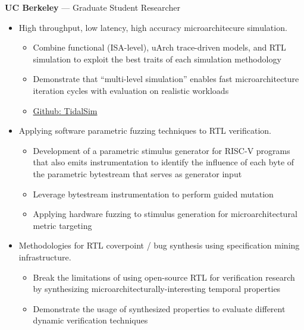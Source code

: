 \documentclass[10pt]{article}
\begin{document}
 \textbf{UC Berkeley} --- Graduate Student Researcher
\begin{itemize}
    \item High throughput, low latency, high accuracy microarchitecure simulation.
    \begin{itemize}
        \item Combine functional (ISA-level), uArch trace-driven models, and RTL simulation to exploit the best traits of each simulation methodology
        \item Demonstrate that ``multi-level simulation'' enables fast microarchitecture iteration cycles with evaluation on realistic workloads
        \item \href{https://github.com/euphoric-hardware/tidalsim}{Github: TidalSim}
    \end{itemize}
    \item Applying software parametric fuzzing techniques to RTL verification.
    \begin{itemize}
        \item Development of a parametric stimulus generator for RISC-V programs that also emits instrumentation to identify the influence of each byte of the parametric bytestream that serves as generator input
        \item Leverage bytestream instrumentation to perform guided mutation
        \item Applying hardware fuzzing to stimulus generation for microarchitectural metric targeting
    \end{itemize}
    \item Methodologies for RTL coverpoint / bug synthesis using specification mining infrastructure.
    \begin{itemize}
        \item Break the limitations of using open-source RTL for verification research by synthesizing microarchitecturally-interesting temporal properties
        \item Demonstrate the usage of synthesized properties to evaluate different dynamic verification techniques

\end{itemize}
\end{itemize}
\end{document}

